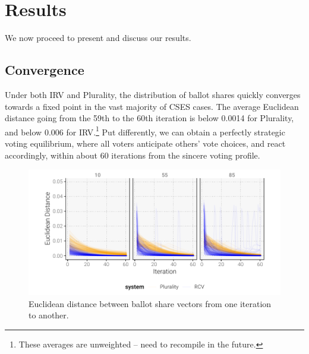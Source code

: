 \documentclass[11pt,a4paper]{article}
\begin{document}
\section{Results}

We now proceed to present and discuss our results.

\subsection{Convergence}

Under both IRV and Plurality, the distribution of ballot shares quickly converges towards a fixed point in the vast majority of CSES cases. The average Euclidean distance going from the 59th to the 60th iteration is below 0.0014 for Plurality, and below 0.006 for IRV.\footnote{These averages are unweighted -- need to recompile in the future.} Put differently, we can obtain a perfectly strategic voting equilibrium, where all voters anticipate others' vote choices, and react accordingly, within about 60 iterations from the sincere voting profile.

\begin{figure}[!tbh]
	\centering
	\includegraphics[width = \textwidth]{../../output/figures/euclidean}
	\caption{Euclidean distance between ballot share vectors from one iteration to another.}
	\label{fig:convergence}
\end{figure}
\end{document}
